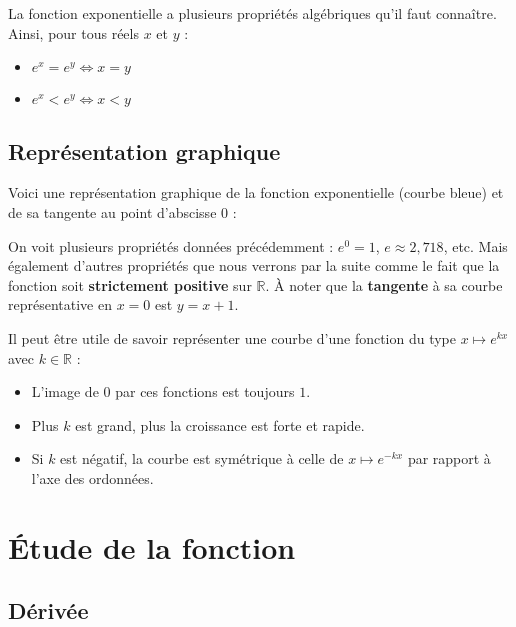 	\begin{formula}
		La fonction exponentielle a plusieurs propriétés algébriques qu'il faut connaître. Ainsi, pour tous réels $x$ et $y$ :
		\begin{itemize}
			\item $e^x = e^y \iff x = y$
			\item $e^x < e^y \iff x < y$
		\end{itemize}
	\end{formula}

	\subsection{Représentation graphique}

	Voici une représentation graphique de la fonction exponentielle (courbe bleue) et de sa tangente au point d'abscisse $0$ :


	On voit plusieurs propriétés données précédemment : $e^0 = 1$, $e \approx 2,718$, etc. Mais également d'autres propriétés que nous verrons par la suite comme le fait que la fonction soit \textbf{strictement positive} sur $\mathbb{R}$. À noter que la \textbf{tangente} à sa courbe représentative en $x = 0$ est $y = x + 1$.

	\begin{tip}
		Il peut être utile de savoir représenter une courbe d'une fonction du type $x \mapsto e^{kx}$ avec $k \in \mathbb{R}$ :
		\begin{itemize}
			\item L'image de $0$ par ces fonctions est toujours $1$.
			\item Plus $k$ est grand, plus la croissance est forte et rapide.
			\item Si $k$ est négatif, la courbe est symétrique à celle de $x \mapsto e^{-kx}$ par rapport à l'axe des ordonnées.
		\end{itemize}
	\end{tip}

	\section{Étude de la fonction}

	\subsection{Dérivée}

